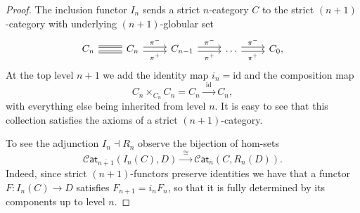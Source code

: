 \documentclass[12pt,a4paper]{article}
\numberwithin{equation}{section}
\newcommand{\cat}[1]{\mathscr{C} \mathsf{at}_{\overline{#1}}}
\begin{document}
\begin{proof}
    The inclusion functor $I_n$ sends a strict $n$-category $C$ to the strict $(n+1)$-category with underlying $(n+1)$-globular set
    \begin{equation}
        \begin{tikzcd}
            C_n \arrow[r, shift left=0.6ex, Rightarrow, no head] \arrow[r, shift right=0.6ex, Rightarrow, no head] & C_n \arrow[r, shift left=0.5ex, "\pi^-"] \arrow[r, shift right=0.5ex, "\pi^+"'] & C_{n-1} \arrow[r, shift left=0.5ex, "\pi^-"] \arrow[r, shift right=0.5ex, "\pi^+"'] & \dots \arrow[r, shift left=0.5ex, "\pi^-"] \arrow[r, shift right=0.5ex, "\pi^+"'] & C_0,
        \end{tikzcd}
    \end{equation}
    At the top level $n+1$ we add the identity map $i_{n} = \mathrm{id}$ and the composition map
    \begin{equation}
        C_n \mathop{\times}_{C_n} C_n = C_n \xrightarrow{\ \ \mathrm{id} \ \ } C_n,
    \end{equation}
    with everything else being inherited from level $n$. It is easy to see that this collection satisfies the axioms of a strict $(n+1)$-category.

    To see the adjunction $I_n \dashv R_n$ observe the bijection of hom-sets
    \begin{equation}
        \cat{n+1}(I_n (C), D) \xrightarrow{\ \ \cong \ \ } \cat{n} (C, R_n (D)).
    \end{equation}
    Indeed, since strict $(n+1)$-functors preserve identities we have that a functor $F: I_n (C) \to D$ satisfies $F_{n+1} = i_n F_n$, so that it is fully determined by its components up to level $n$. 


\end{proof}
\end{document}

